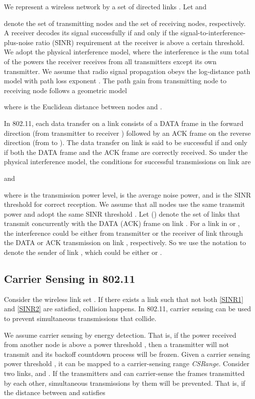 \documentclass[conference]{IEEEtran}
\begin{document}
We represent a wireless network by a set of directed links
. Let
 and

denote the set of transmitting nodes and the set of receiving nodes,
respectively. A receiver decodes its signal successfully if and only
if the signal-to-interference-plus-noise ratio (SINR) requirement at
the receiver is above a certain threshold. We adopt the physical
interference model, where the interference is the sum total of the
powers the receiver receives from all transmitters except its own
transmitter. We assume that radio signal propagation obeys the
log-distance path model with path loss exponent . The path
gain  from transmitting node  to receiving node
 follows a geometric model

where  is the Euclidean distance between nodes  and
.


In 802.11, each data transfer on a link  consists of a DATA
frame in the forward direction (from transmitter  to receiver
) followed by an ACK frame on the reverse direction (from 
to ). The data transfer on link  is said to be successful
if and only if both the DATA frame and the ACK frame are correctly
received. So under the physical interference model, the conditions
for successful transmissions on link  are

and

where  is the transmission power level,  is the average noise
power, and  is the SINR threshold for correct reception.
We assume that all nodes use the same transmit power  and adopt
the same SINR threshold . Let 
() denote the set of links that transmit concurrently
with the DATA (ACK) frame on link . For a link  in
 or , the interference could be either
from transmitter  or the receiver  of link  through
the DATA or ACK transmission on link , respectively. So we use
the notation  to denote the sender of link , which could
be either  or .

\subsection{Carrier Sensing in 802.11}

Consider the wireless link set . If there exists a link
 such that not both \eqref{SINR1} and
\eqref{SINR2} are satisf\/ied, collision happens. In 802.11, carrier
sensing can be used to prevent simultaneous transmissions that
collide.

We assume carrier sensing by energy detection. That is, if the power
received from another node is above a power threshold , then
a transmitter will not transmit and its backoff countdown process
will be frozen. Given a carrier sensing power threshold , it
can be mapped to a carrier-sensing range \emph{CSRange}. Consider
two links,  and . If the transmitters  and  can
carrier-sense the frames transmitted by each other, simultaneous
transmissions by them will be prevented. That is, if the distance
between  and  satisf\/ies
\end{document}
